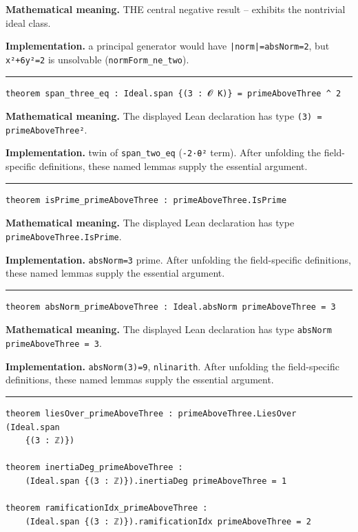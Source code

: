 \documentclass[UTF8,a4paper,11pt,fontset=fandol]{ctexart}
\theoremstyle{definition}
\newcommand{\statementsep}{\par\medskip\hrule\medskip}
\begin{document}
\noindent\textbf{Mathematical meaning.} THE central negative result -- exhibits the nontrivial ideal class.\par
\noindent\textbf{Implementation.} a principal generator would have \texttt{|norm|=absNorm=2}, but \texttt{x²+6y²=2} is unsolvable (\texttt{normForm\_\allowbreak{}ne\_\allowbreak{}two}).\par
\statementsep
\begin{verbatim}
theorem span_three_eq : Ideal.span {(3 : 𝓞 K)} = primeAboveThree ^ 2
\end{verbatim}
\noindent\textbf{Mathematical meaning.} The displayed Lean declaration has type \texttt{(3) = primeAboveThree²}.\par
\noindent\textbf{Implementation.} twin of \texttt{span\_\allowbreak{}two\_\allowbreak{}eq} (\texttt{-2·θ²} term). After unfolding the field-specific definitions, these named lemmas supply the essential argument.\par
\statementsep
\begin{verbatim}
theorem isPrime_primeAboveThree : primeAboveThree.IsPrime
\end{verbatim}
\noindent\textbf{Mathematical meaning.} The displayed Lean declaration has type \texttt{primeAboveThree.\allowbreak{}IsPrime}.\par
\noindent\textbf{Implementation.} \texttt{absNorm=3} prime. After unfolding the field-specific definitions, these named lemmas supply the essential argument.\par
\statementsep
\begin{verbatim}
theorem absNorm_primeAboveThree : Ideal.absNorm primeAboveThree = 3
\end{verbatim}
\noindent\textbf{Mathematical meaning.} The displayed Lean declaration has type \texttt{absNorm primeAboveThree = 3}.\par
\noindent\textbf{Implementation.} \texttt{absNorm(3)=9}, \texttt{nlinarith}. After unfolding the field-specific definitions, these named lemmas supply the essential argument.\par
\statementsep
\begin{verbatim}
theorem liesOver_primeAboveThree : primeAboveThree.LiesOver (Ideal.span
    {(3 : ℤ)})

theorem inertiaDeg_primeAboveThree :
    (Ideal.span {(3 : ℤ)}).inertiaDeg primeAboveThree = 1

theorem ramificationIdx_primeAboveThree :
    (Ideal.span {(3 : ℤ)}).ramificationIdx primeAboveThree = 2
\end{verbatim}
\end{document}
